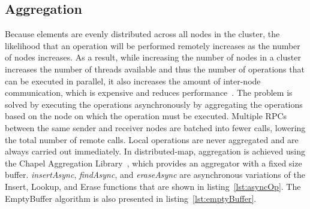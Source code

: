 \documentclass[letterpaper, 10 pt, conference]{ieeeconf}  %
\begin{document}
\subsection{Aggregation}
Because elements are evenly distributed across all nodes in the cluster, the likelihood that an operation will be performed remotely increases as the number of nodes increases. As a result, while increasing the number of nodes in a cluster increases the number of threads available and thus the number of operations that can be executed in parallel, it also increases the amount of inter-node communication, which is expensive and reduces performance~\cite{kshemkalyani2011distributed}. The problem is solved by executing the operations asynchronously by aggregating the operations based on the node on which the operation must be executed. Multiple RPCs between the same sender and receiver nodes are batched into fewer calls, lowering the total number of remote calls. Local operations are never aggregated and are always carried out immediately. In distributed-map, aggregation is achieved using the Chapel Aggregation Library~\cite{jenkinsChapelAggregationLibrary2018}, which provides an aggregator with a fixed size buffer. \textit{insertAsync}, \textit{findAsync}, and \textit{eraseAsync} are asynchronous variations of the Insert, Lookup, and Erase functions that are shown in listing~\ref{lst:asyncOp}. The EmptyBuffer algorithm is also presented in listing~\ref{lst:emptyBuffer}.
\end{document}

